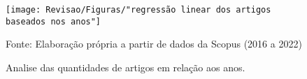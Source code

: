 \begin{figure}[htp!]
	\centering
	\caption{Analise das quantidades de artigos em relação aos anos.}
	\label{fig:regressao-linear-dos-artigos-baseados-nos-anos}
	\texttt{[image: Revisao/Figuras/"regressão linear dos artigos baseados nos anos"]}
	
	\vspace{0.2cm}
	Fonte: Elaboração própria a partir de dados da Scopus (2016 a 2022)
\end{figure}